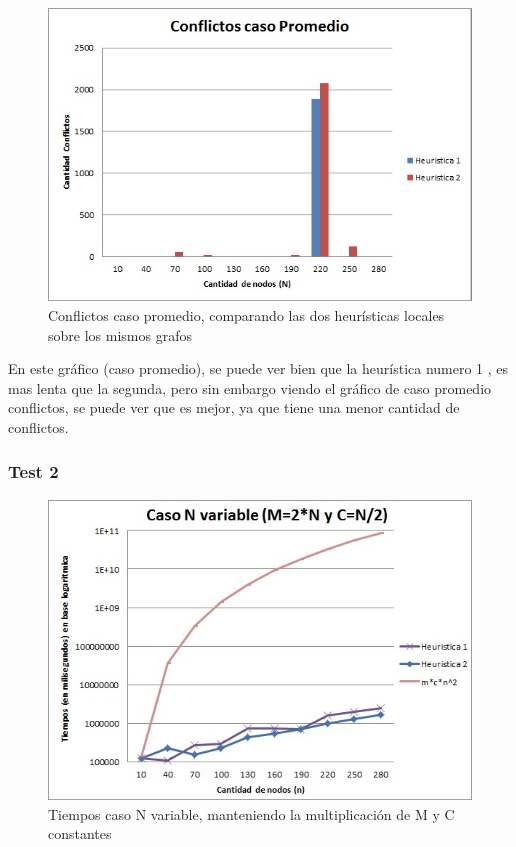 \begin{figure}[H]
  \begin{center}
      \includegraphics[scale=0.75]{../Ejercicio4PromedioConflictos.jpg}
  \end{center}
  \caption{Conflictos caso promedio, comparando las dos heurísticas locales sobre los mismos grafos}
\end{figure}

En este gráfico (caso promedio), se puede ver bien que la heurística numero 1 , es mas lenta que la segunda, pero sin embargo viendo el gráfico de caso promedio conflictos, se puede ver que es mejor, ya que tiene una menor cantidad de conflictos.

\subsubsection{Test 2}

\vspace*{0.3cm}

\begin{figure}[H]
  \begin{center}
      \includegraphics[scale=0.75]{../Ejercicio4NVariable.jpg}
  \end{center}
  \caption{Tiempos caso N variable, manteniendo la multiplicación de M y C constantes}
\end{figure}

